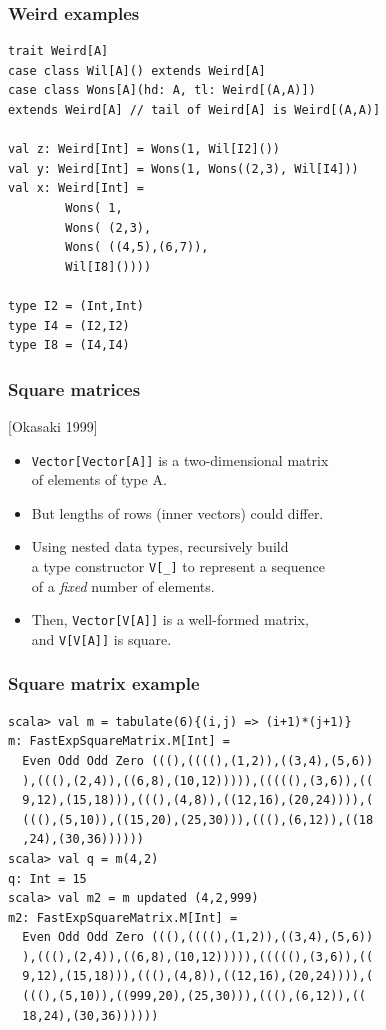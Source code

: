\documentclass[14pt,t,usepdftitle=false,
xcolornames=x11names,svgnames,dvipsnames]{beamer}
\begin{document}
\begin{frame}[fragile]
  \frametitle{Weird examples}
\begin{lstlisting}[style=scala,moreemph={Weird}]
trait Weird[A]
case class Wil[A]() extends Weird[A]
case class Wons[A](hd: A, tl: Weird[(A,A)])
extends Weird[A] // tail of Weird[A] is Weird[(A,A)]

val z: Weird[Int] = Wons(1, Wil[I2]())
val y: Weird[Int] = Wons(1, Wons((2,3), Wil[I4]))
val x: Weird[Int] =
        Wons( 1,
        Wons( (2,3),
        Wons( ((4,5),(6,7)),
        Wil[I8]())))

type I2 = (Int,Int)
type I4 = (I2,I2)
type I8 = (I4,I4)
\end{lstlisting}
\end{frame}

\begin{frame}
  \frametitle{Square matrices}
  \hfill[Okasaki 1999]
  \begin{itemize}
  \item 
    \lstinline!Vector[Vector[A]]! is a two-dimensional matrix\\
    of elements of type A.
  \item But lengths of rows (inner vectors) could differ.
  \item Using nested data types, recursively build\\a type constructor
    \lstinline!V[_]! to represent a sequence\\of a \emph{fixed} number of
    elements.
  \item Then, \lstinline!Vector[V[A]]! is a well-formed matrix,\\and
    \lstinline!V[V[A]]! is square.
  \end{itemize}
\end{frame}

\begin{frame}[fragile]
  \frametitle{Square matrix example}
\begin{lstlisting}[style=scalarepl]
scala> val m = tabulate(6){(i,j) => (i+1)*(j+1)}
m: FastExpSquareMatrix.M[Int] =
  Even Odd Odd Zero (((),((((),(1,2)),((3,4),(5,6))
  ),(((),(2,4)),((6,8),(10,12))))),(((((),(3,6)),((
  9,12),(15,18))),(((),(4,8)),((12,16),(20,24)))),(
  (((),(5,10)),((15,20),(25,30))),(((),(6,12)),((18
  ,24),(30,36))))))
scala> val q = m(4,2)
q: Int = 15
scala> val m2 = m updated (4,2,999)
m2: FastExpSquareMatrix.M[Int] =
  Even Odd Odd Zero (((),((((),(1,2)),((3,4),(5,6))
  ),(((),(2,4)),((6,8),(10,12))))),(((((),(3,6)),((
  9,12),(15,18))),(((),(4,8)),((12,16),(20,24)))),(
  (((),(5,10)),((999,20),(25,30))),(((),(6,12)),((
  18,24),(30,36))))))
\end{lstlisting}
\end{frame}
\end{document}
